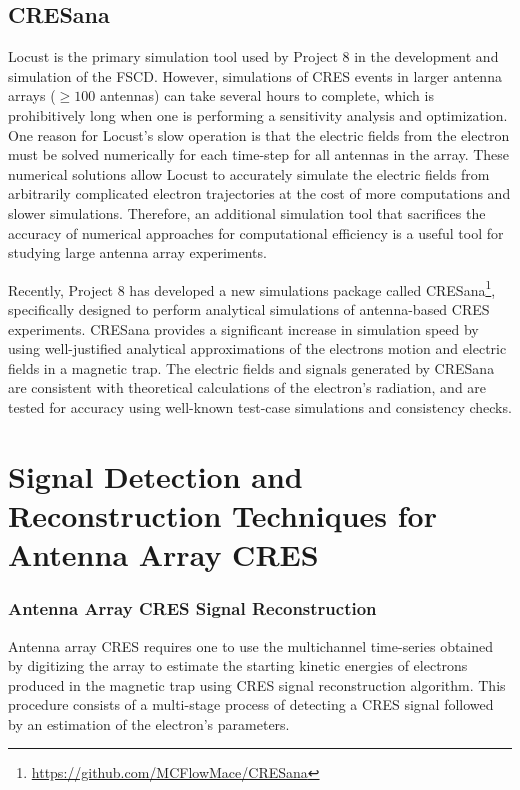 \subsection{CRESana}
\label{sec:chap4-cresana}

Locust is the primary simulation tool used by Project 8 in the development and simulation of the FSCD. However, simulations of CRES events in larger antenna arrays ($\geq100$ antennas) can take several hours to complete, which is prohibitively long when one is performing a sensitivity analysis and optimization. One reason for Locust's slow operation is that the electric fields from the electron must be solved numerically for each time-step for all antennas in the array. These numerical solutions allow Locust to accurately simulate the electric fields from arbitrarily complicated electron trajectories at the cost of more computations and slower simulations. Therefore, an additional simulation tool that sacrifices the accuracy of numerical approaches for computational efficiency is a useful tool for studying large antenna array experiments.

Recently, Project 8 has developed a new simulations package called CRESana\footnote{\url{https://github.com/MCFlowMace/CRESana}}, specifically designed to perform analytical simulations of antenna-based CRES experiments. CRESana provides a significant increase in simulation speed by using well-justified analytical approximations of the electrons motion and electric fields in a magnetic trap. The electric fields and signals generated by CRESana are consistent with theoretical calculations of the electron's radiation, and are tested for accuracy using well-known test-case simulations and consistency checks. 

\section{Signal Detection and Reconstruction Techniques for Antenna Array CRES}
\label{sec:chap4-pter}

\subsubsection*{Antenna Array CRES Signal Reconstruction}

Antenna array CRES requires one to use the multichannel time-series obtained by digitizing the array to estimate the starting kinetic energies of electrons produced in the magnetic trap using CRES signal reconstruction algorithm. This procedure consists of a multi-stage process of detecting a CRES signal followed by an estimation of the electron's parameters.

